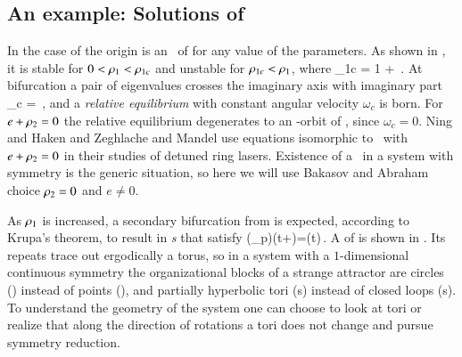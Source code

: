 
\subsection{\label{s:CLEsols} An example: Solutions of \cLe}

In the case of {\cLe}  the origin  is an \eqv\ of
 for any value of the parameters. As shown in
, it is stable for $0<\rho_1<\rho_{1c}$
and unstable for $\rho_{1c}<\rho_1$, where
\beq
	\rho_{1c} = 1 + \,.
\eeq
At bifurcation a pair of eigenvalues crosses the imaginary
axis with imaginary part
\beq
	\omega_c = 
\,,
	\label{eq:omegaCLE}
\eeq
and a \emph{relative equilibrium}  with
constant angular velocity $\omega_c$ is born. For
$e+\rho_2=0$ the relative equilibrium degenerates to an
-orbit of \eqva{}, since $\omega_c =0$.
Ning and Haken and Zeghlache and
Mandel use equations isomorphic to \cLe\ with
$e+\rho_2=0$ in their studies of detuned ring lasers.
Existence of a \reqv\ in a system with  symmetry is
the generic situation, so here we will use Bakasov and
Abraham choice $\rho_2=0$ and $e \neq
0$.

As $\rho_1$ is increased,  a secondary bifurcation from
 is expected, according to Krupa's
theorem, to result in \emph{\rpo s} that satisfy
\beq
    \LieEl(\gSpace_p)\ssp(t+)=\ssp(t)\,.
\eeq
A {\rpo} of {\cLe} is shown in . Its repeats
trace out ergodically a torus, so in a system with a
$1$-dimensional continuous symmetry the organizational blocks
of a strange attractor are circles (\reqva) instead of points
(\eqva), and partially hyperbolic tori (\rpo s) instead of
closed loops (\po s). To understand the geometry of the
system one can choose to look at tori or realize that along
the direction of rotations a tori does not change and pursue
symmetry reduction.


